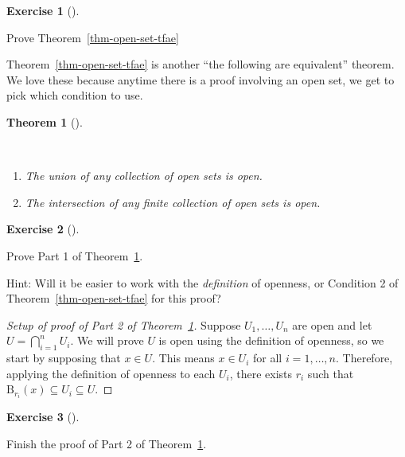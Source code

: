 \documentclass[
  letterpaper,
  DIV=11,
  numbers=noendperiod]{scrreprt}
\providecommand{\tightlist}{%
  \setlength{\itemsep}{0pt}\setlength{\parskip}{0pt}}
\newcommand{\bee}{\mathrm{B}}
\theoremstyle{plain}
\newtheorem{theorem}{Theorem}[chapter]
\theoremstyle{definition}
\newtheorem{exercise}{Exercise}[chapter]
\theoremstyle{plain}
\theoremstyle{plain}
\theoremstyle{definition}
\theoremstyle{definition}
\theoremstyle{remark}
\begin{document}
\begin{exercise}[]\protect\hypertarget{exr-prove-open-set-tfae}{}\label{exr-prove-open-set-tfae}

Prove Theorem~\ref{thm-open-set-tfae}

\end{exercise}

Theorem~\ref{thm-open-set-tfae} is another ``the following are
equivalent'' theorem. We love these because anytime there is a proof
involving an open set, we get to pick which condition to use.

\begin{theorem}[]\protect\hypertarget{thm-unions-and-intersections-of-open-sets}{}\label{thm-unions-and-intersections-of-open-sets}

~

\begin{enumerate}
\def\labelenumi{\arabic{enumi}.}
\tightlist
\item
  The union of any collection of open sets is open.
\item
  The intersection of any finite collection of open sets is open.
\end{enumerate}

\end{theorem}

\begin{exercise}[]\protect\hypertarget{exr-unions-of-open-sets}{}\label{exr-unions-of-open-sets}

Prove Part 1 of Theorem~\ref{thm-unions-and-intersections-of-open-sets}.

Hint: Will it be easier to work with the \emph{definition} of openness,
or Condition 2 of Theorem~\ref{thm-open-set-tfae} for this proof?

\end{exercise}

\begin{proof}[Setup of proof of Part 2 of
Theorem~\ref{thm-unions-and-intersections-of-open-sets}]
Suppose \(U_1,\ldots,U_n\) are open and let \(U=\bigcap_{i=1}^n U_i\).
We will prove \(U\) is open using the definition of openness, so we
start by supposing that \(x\in U\). This means \(x\in U_i\) for all
\(i=1,\ldots,n\). Therefore, applying the definition of openness to each
\(U_i\), there exists \(r_i\) such that
\(\bee_{r_i}(x)\subseteq U_i\subseteq U\).
\end{proof}

\begin{exercise}[]\protect\hypertarget{exr-intersections-of-open-sets}{}\label{exr-intersections-of-open-sets}

Finish the proof of Part 2 of
Theorem~\ref{thm-unions-and-intersections-of-open-sets}.

\end{exercise}
\end{document}

